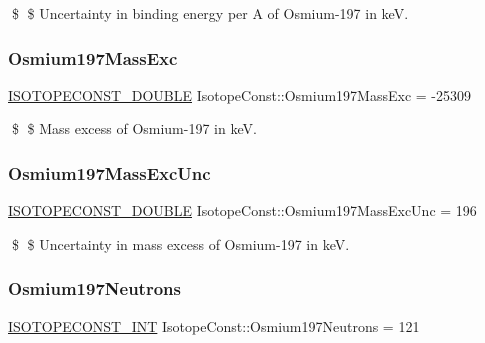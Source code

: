 \$ \$ Uncertainty in binding energy per A of Osmium-\/197 in keV. \mbox{\label{group___isotope_const-_osmium-_os197_gae905a786ff3c61c3c16f6eb4416befa5}} 
\subsubsection{\texorpdfstring{Osmium197\+Mass\+Exc}{Osmium197MassExc}}
{\footnotesize\ttfamily \mbox{\hyperlink{group___isotope_const-_macros_ga8f45a7272ce02c0b4c65c44636ed719a}{I\+S\+O\+T\+O\+P\+E\+C\+O\+N\+S\+T\+\_\+\+D\+O\+U\+B\+LE}} Isotope\+Const\+::\+Osmium197\+Mass\+Exc = -\/25309}

\$ \$ Mass excess of Osmium-\/197 in keV. \mbox{\label{group___isotope_const-_osmium-_os197_ga3feaad64c298f744defcb59bf72c892f}} 
\subsubsection{\texorpdfstring{Osmium197\+Mass\+Exc\+Unc}{Osmium197MassExcUnc}}
{\footnotesize\ttfamily \mbox{\hyperlink{group___isotope_const-_macros_ga8f45a7272ce02c0b4c65c44636ed719a}{I\+S\+O\+T\+O\+P\+E\+C\+O\+N\+S\+T\+\_\+\+D\+O\+U\+B\+LE}} Isotope\+Const\+::\+Osmium197\+Mass\+Exc\+Unc = 196}

\$ \$ Uncertainty in mass excess of Osmium-\/197 in keV. \mbox{\label{group___isotope_const-_osmium-_os197_ga8fd449f7069f2b6e39bfe94a1b9f26d5}} 
\subsubsection{\texorpdfstring{Osmium197\+Neutrons}{Osmium197Neutrons}}
{\footnotesize\ttfamily \mbox{\hyperlink{group___isotope_const-_macros_ga5f18360b3e99483a35c32d789e62621c}{I\+S\+O\+T\+O\+P\+E\+C\+O\+N\+S\+T\+\_\+\+I\+NT}} Isotope\+Const\+::\+Osmium197\+Neutrons = 121}

